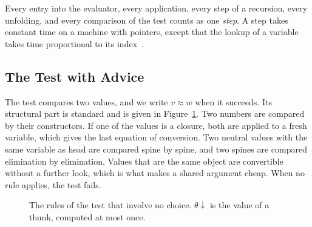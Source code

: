 \documentclass[acmsmall,nonacm,screen]{acmart}
\newcommand{\kw}[1]{\mathsf{#1}}
\newcommand{\suc}{\kw{S}}
\begin{document}
Every entry into the evaluator, every application, every step of a recursion, every
unfolding, and every comparison of the test counts as one \emph{step}. A step takes constant
time on a machine with pointers, except that the lookup of a variable takes time
proportional to its index~\cite{debruijn1972}.

\subsection{The Test with Advice}

The test compares two values, and we write $v \approx w$ when it succeeds. Its structural
part is standard and is given in Figure~\ref{fig:test}. Two numbers are compared by their
constructors. If one of the values is a closure, both are applied to a fresh variable, which
gives the last equation of conversion. Two neutral values with the same variable as head are
compared spine by spine, and two spines are compared elimination by elimination. Values that
are the same object are convertible without a further look, which is what makes a shared
argument cheap. When no rule applies, the test fails.

\begin{figure}
\caption{The rules of the test that involve no choice. $\theta{\downarrow}$ is the value of a
thunk, computed at most once.}
\label{fig:test}
\end{figure}
\end{document}
